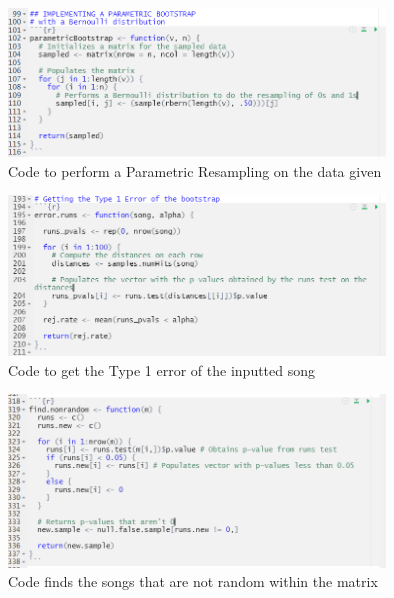 \documentclass[12pt, letterpaper]{article}
\begin{document}
\begin{figure}[!hb]
\centering
\includegraphics[width=10cm]{ParametricBootstrapCode.png}
\caption{Code to perform a Parametric Resampling on the data given}
\label{fig: Parametric Bootstrap Code}
\end{figure}

\begin{figure}[!hb]
\centering
\includegraphics[width=10cm]{Type1ErrCode.png}
\caption{Code to get the Type 1 error of the inputted song}
\label{fig: Type 1 Error Code}
\end{figure}

\begin{figure}
\centering
\includegraphics[width=10cm]{FindNonRandomCode.png}
\caption{Code finds the songs that are not random within the matrix}
\label{fig: Find Nonrandom Songs Code}
\end{figure}
\end{document}
